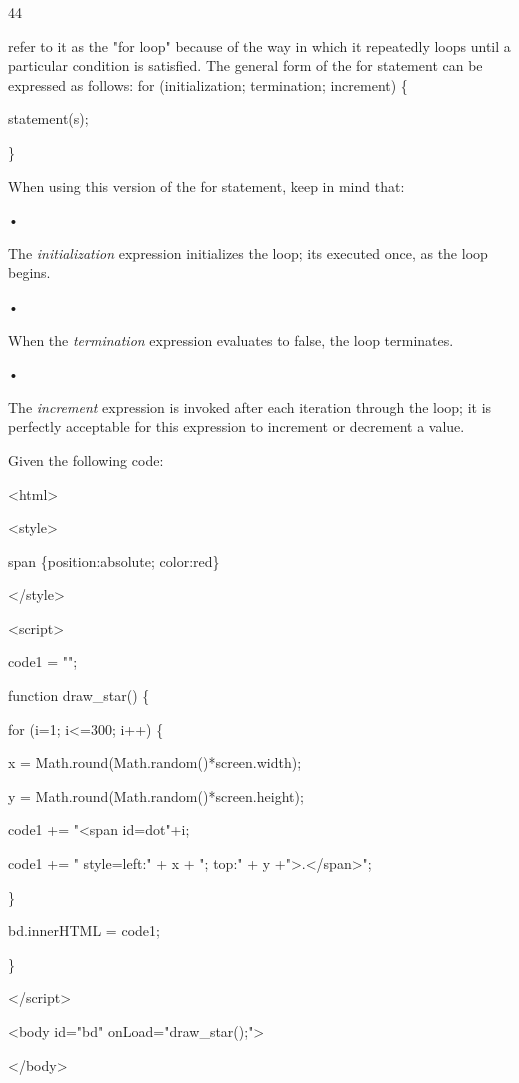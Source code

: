 \documentclass[
]{article}
\begin{document}
44

\protect\hypertarget{index_split_004.htmlux5cux23p45}{}{}refer to it as
the "for loop" because of the way in which it repeatedly loops until a
particular condition is satisfied. The general form of the for statement
can be expressed as follows: for (initialization; termination;
increment) \{

statement(s);

\}

When using this version of the for statement, keep in mind that:

•

The \emph{initialization} expression initializes the loop;
it\textquotesingle s executed once, as the loop begins.

•

When the \emph{termination} expression evaluates to false, the loop
terminates.

•

The \emph{increment} expression is invoked after each iteration through
the loop; it is perfectly acceptable for this expression to increment or
decrement a value.

Given the following code:

\textless html\textgreater{}

\textless style\textgreater{}

span \{position:absolute; color:red\}

\textless/style\textgreater{}

\textless script\textgreater{}

code1 = "";

function draw\_star() \{

for (i=1; i\textless=300; i++) \{

x = Math.round(Math.random()*screen.width);

y = Math.round(Math.random()*screen.height);

code1 += "\textless span id=dot"+i;

code1 += " style=\textquotesingle left:" + x + "; top:" + y
+"\textquotesingle\textgreater.\textless/span\textgreater";

\}

bd.innerHTML = code1;

\}

\textless/script\textgreater{}

\textless body id="bd" onLoad="draw\_star();"\textgreater{}

\textless/body\textgreater{}
\end{document}
